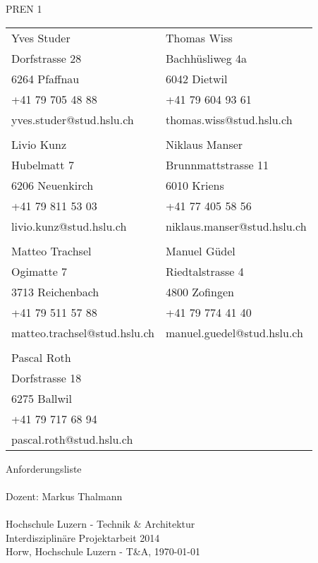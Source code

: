 \begin{titlepage}
    \parindent0pt {\Huge PREN 1}\\
    \vspace*{0.7cm}
    \newline
    \begin{tabular}{ p{6cm} p{5cm}}
        Yves Studer                & Thomas Wiss \\
        Dorfstrasse 28             & Bachhüsliweg 4a \\
        6264 Pfaffnau              & 6042 Dietwil \\
        +41 79 705 48 88           & +41 79 604 93 61 \\
        yves.studer@stud.hslu.ch   & thomas.wiss@stud.hslu.ch \\
                                   & \\
        Livio Kunz                 & Niklaus Manser \\
        Hubelmatt 7                & Brunnmattstrasse 11\\
        6206 Neuenkirch            & 6010 Kriens \\
        +41 79 811 53 03           & +41 77 405 58 56 \\
        livio.kunz@stud.hslu.ch    & niklaus.manser@stud.hslu.ch \\
                                   & \\
        Matteo Trachsel			   & Manuel Güdel \\
        Ogimatte 7                 & Riedtalstrasse 4\\
        3713 Reichenbach           & 4800 Zofingen\\
        +41 79 511 57 88           & +41 79 774 41 40 \\
        matteo.trachsel@stud.hslu.ch & manuel.guedel@stud.hslu.ch \\
        						   & \\
        Pascal Roth			       & \\
        Dorfstrasse 18			   & \\
        6275 Ballwil		       & \\
        +41 79 717 68 94	       & \\
        pascal.roth@stud.hslu.ch   & \\
    \end{tabular}
    \vspace*{1.7cm}
    \newline
    {\Huge Anforderungsliste}\\
    \vspace*{1.2cm}\\
    {\normalsize Dozent: Markus Thalmann}\\
    \vspace*{0.2cm}\\
    {\normalsize Hochschule Luzern - Technik \& Architektur}\\
    {\normalsize Interdisziplinäre Projektarbeit 2014}\\
    \vspace*{2.3cm}
    \newline
    {\normalsize Horw, Hochschule Luzern - T\&A, \today}\\
\end{titlepage}
